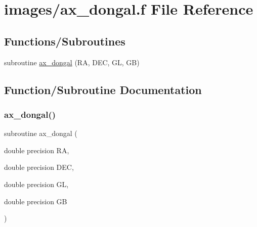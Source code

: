 \hypertarget{ax__dongal_8f}{}\section{images/ax\+\_\+dongal.f File Reference}
\label{ax__dongal_8f}
\subsection*{Functions/\+Subroutines}
\begin{DoxyCompactItemize}
\item 
subroutine \hyperlink{ax__dongal_8f_a2a25d7ac80db3793061ccc433bc17292}{ax\+\_\+dongal} (RA, D\+EC, GL, GB)
\end{DoxyCompactItemize}


\subsection{Function/\+Subroutine Documentation}
\mbox{\label{ax__dongal_8f_a2a25d7ac80db3793061ccc433bc17292}} 
\subsubsection{\texorpdfstring{ax\+\_\+dongal()}{ax\_dongal()}}
{\footnotesize\ttfamily subroutine ax\+\_\+dongal (\begin{DoxyParamCaption}\item[{double precision}]{RA,  }\item[{double precision}]{D\+EC,  }\item[{double precision}]{GL,  }\item[{double precision}]{GB }\end{DoxyParamCaption})}

